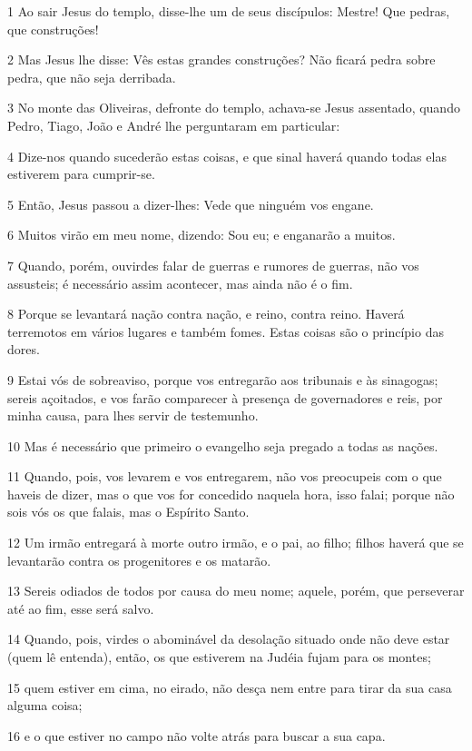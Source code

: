 \par 1 Ao sair Jesus do templo, disse-lhe um de seus discípulos: Mestre! Que pedras, que construções!
\par 2 Mas Jesus lhe disse: Vês estas grandes construções? Não ficará pedra sobre pedra, que não seja derribada.
\par 3 No monte das Oliveiras, defronte do templo, achava-se Jesus assentado, quando Pedro, Tiago, João e André lhe perguntaram em particular:
\par 4 Dize-nos quando sucederão estas coisas, e que sinal haverá quando todas elas estiverem para cumprir-se.
\par 5 Então, Jesus passou a dizer-lhes: Vede que ninguém vos engane.
\par 6 Muitos virão em meu nome, dizendo: Sou eu; e enganarão a muitos.
\par 7 Quando, porém, ouvirdes falar de guerras e rumores de guerras, não vos assusteis; é necessário assim acontecer, mas ainda não é o fim.
\par 8 Porque se levantará nação contra nação, e reino, contra reino. Haverá terremotos em vários lugares e também fomes. Estas coisas são o princípio das dores.
\par 9 Estai vós de sobreaviso, porque vos entregarão aos tribunais e às sinagogas; sereis açoitados, e vos farão comparecer à presença de governadores e reis, por minha causa, para lhes servir de testemunho.
\par 10 Mas é necessário que primeiro o evangelho seja pregado a todas as nações.
\par 11 Quando, pois, vos levarem e vos entregarem, não vos preocupeis com o que haveis de dizer, mas o que vos for concedido naquela hora, isso falai; porque não sois vós os que falais, mas o Espírito Santo.
\par 12 Um irmão entregará à morte outro irmão, e o pai, ao filho; filhos haverá que se levantarão contra os progenitores e os matarão.
\par 13 Sereis odiados de todos por causa do meu nome; aquele, porém, que perseverar até ao fim, esse será salvo.
\par 14 Quando, pois, virdes o abominável da desolação situado onde não deve estar (quem lê entenda), então, os que estiverem na Judéia fujam para os montes;
\par 15 quem estiver em cima, no eirado, não desça nem entre para tirar da sua casa alguma coisa;
\par 16 e o que estiver no campo não volte atrás para buscar a sua capa.
